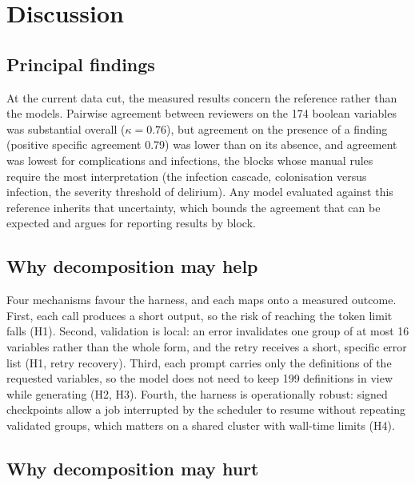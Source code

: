 \section{Discussion}\label{sec:discussion}

\subsection{Principal findings}

 At the current data cut, the
measured results concern the reference rather than the models. Pairwise agreement between reviewers on
the 174 boolean variables was substantial overall ($\kappa=0.76$), but agreement on the presence of a
finding (positive specific agreement 0.79) was lower than on its absence, and agreement was lowest for
complications and infections, the blocks whose manual rules require the most interpretation (the
infection cascade, colonisation versus infection, the severity threshold of delirium). Any model
evaluated against this reference inherits that uncertainty, which bounds the agreement that can be
expected and argues for reporting results by block.

\subsection{Why decomposition may help}

Four mechanisms favour the harness, and each maps onto a measured outcome. First, each call produces a
short output, so the risk of reaching the token limit falls (H1). Second, validation is local: an error
invalidates one group of at most 16 variables rather than the whole form, and the retry receives a
short, specific error list (H1, retry recovery). Third, each prompt carries only the definitions of the
requested variables, so the model does not need to keep 199 definitions in view while generating
(H2, H3). Fourth, the harness is operationally robust: signed checkpoints allow a job interrupted by the
scheduler to resume without repeating validated groups, which matters on a shared cluster with wall-time
limits (H4).

\subsection{Why decomposition may hurt}

